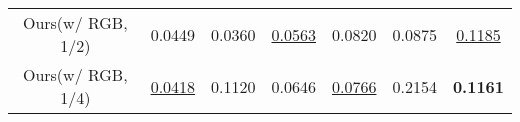 \begin{table}[]
\begin{adjustbox}{width=1\linewidth}
\begin{tabular}{c|ccc|ccc}
Ours(w/ RGB, 1/2)                & 0.0449                        & 0.0360                        & \underline{0.0563}                         & 0.0820                        & 0.0875                        & \underline{0.1185}                        \\
Ours(w/ RGB, 1/4)                & \underline{0.0418}                        & 0.1120                        & 0.0646                         & \underline{0.0766}                        & 0.2154                        & \textbf{0.1161}                        \\ \hline
\end{tabular}
\end{adjustbox}
\label{ablation}
\vspace{-5mm}
\end{table}
